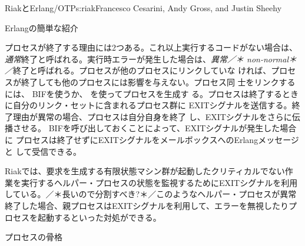 \begin{aosachapter}{RiakとErlang/OTP}{s:riak}{Francesco Cesarini, Andy Gross, and Justin Sheehy}
\begin{aosasect1}{Erlangの簡単な紹介}

プロセスが終了する理由には2つある。これ以上実行するコードがない場合は、
\emph{通常}終了と呼ばれる。実行時エラーが発生した場合は、\emph{異常／＊
  non-normal＊／}終了と呼ばれる。プロセスが他のプロセスにリンクしていな
ければ、プロセスが終了しても他のプロセスには影響を与えない。プロセス同
士をリンクするには、 BIFを使うか、
を使ってプロセスを生成す
る。プロセスは終了するときに自分のリンク・セットに含まれるプロセス群に
EXITシグナルを送信する。終了理由が異常の場合、プロセスは自分自身を終了
し、EXITシグナルをさらに伝播させる。 BIFを呼び出しておくことによって、EXITシグナルが発生した場合に
プロセスは終了せずにEXITシグナルをメールボックスへのErlangメッセージと
して受信できる。


Riakでは、要求を生成する有限状態マシン群が起動したクリティカルでない作
業を実行するヘルパー・プロセスの状態を監視するためにEXITシグナルを利用
している。／＊長いので分割すべき?＊／このようなヘルパー・プロセスが異常
終了した場合、親プロセスはEXITシグナルを利用して、エラーを無視したりプ
ロセスを起動するといった対処ができる。

\end{aosasect1}

\begin{aosasect1}{プロセスの骨格}


\end{aosasect1}
\end{aosachapter}

